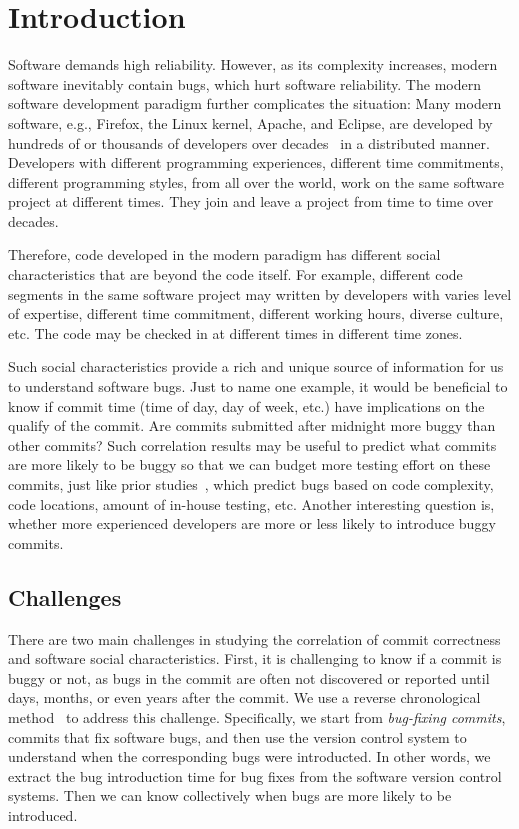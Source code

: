 \section{Introduction}


Software demands high reliability. However, as its complexity increases, 
modern software inevitably contain bugs, which hurt software reliability.
The modern software development paradigm further complicates the situation: 
Many modern software, e.g., Firefox, the Linux kernel, Apache, and Eclipse, 
are developed by hundreds of or thousands of developers over decades~\cite{ccomment} 
in a distributed manner. Developers with different programming experiences, 
different time commitments, different programming styles, from all over the world,
work on the same software project at different times. They join and leave a project 
from time to time over decades. 

Therefore, code developed in the modern paradigm has different social characteristics 
that are beyond the code itself. For example, different code segments in the same
software project may written by developers with  
varies level of expertise, different time 
commitment, different working hours, diverse culture, etc.
The code may be checked in at different times in different time zones. 

Such social characteristics provide a rich and unique source of information for us to 
understand software bugs. Just to name one example, it would be beneficial to know if  
commit time (time of day, day of week, etc.) have implications on the qualify of the commit. 
Are commits submitted after midnight more buggy than other commits? 
Such correlation results may be useful to predict what commits are more likely
to be buggy so that we can budget more testing effort on these commits, just
like prior studies~\cite{graves00predicting, guo04robust, ostrand05predicting},
which predict bugs based on code complexity, 
code locations, amount of in-house testing, etc. 
Another interesting question is, whether more experienced developers are more or less
likely to introduce buggy commits. 


\subsection{Challenges}
There are two main challenges in studying the correlation of commit correctness and software social characteristics.
First, it is challenging to know if a commit is buggy or not,
as bugs in the commit are often not 
discovered or reported until days, months, or even years after the commit. 
We use a reverse chronological method~\cite{2005-changes} to address this challenge. 
Specifically, we start from {\em bug-fixing commits}, commits that fix software bugs, 
and then use the version control system to understand when the corresponding bugs were introducted. 
In other words, we extract the bug introduction time for bug fixes 
from the software version control systems. Then we can know 
collectively when bugs are more likely to be introduced. 

